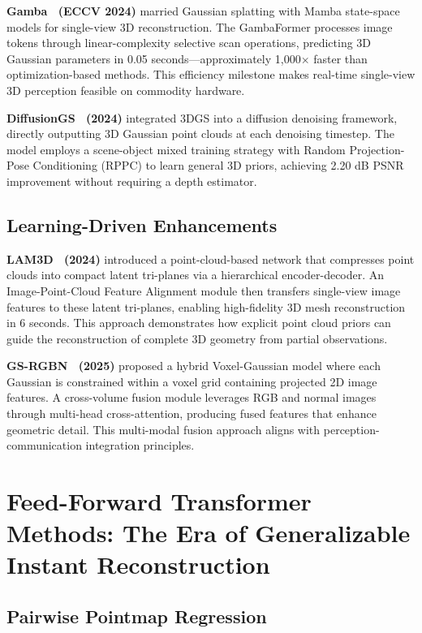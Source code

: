\documentclass[journal]{IEEEtran}
\begin{document}
\textbf{Gamba~\cite{gamba} (ECCV 2024)} married Gaussian splatting with Mamba state-space models for single-view 3D reconstruction. The GambaFormer processes image tokens through linear-complexity selective scan operations, predicting 3D Gaussian parameters in 0.05 seconds---approximately 1,000$\times$ faster than optimization-based methods. This efficiency milestone makes real-time single-view 3D perception feasible on commodity hardware.

\textbf{DiffusionGS~\cite{diffusiongs} (2024)} integrated 3DGS into a diffusion denoising framework, directly outputting 3D Gaussian point clouds at each denoising timestep. The model employs a scene-object mixed training strategy with Random Projection-Pose Conditioning (RPPC) to learn general 3D priors, achieving 2.20 dB PSNR improvement without requiring a depth estimator.

\subsection{Learning-Driven Enhancements}

\textbf{LAM3D~\cite{lam3d} (2024)} introduced a point-cloud-based network that compresses point clouds into compact latent tri-planes via a hierarchical encoder-decoder. An Image-Point-Cloud Feature Alignment module then transfers single-view image features to these latent tri-planes, enabling high-fidelity 3D mesh reconstruction in 6 seconds. This approach demonstrates how explicit point cloud priors can guide the reconstruction of complete 3D geometry from partial observations.

\textbf{GS-RGBN~\cite{gsrgbn} (2025)} proposed a hybrid Voxel-Gaussian model where each Gaussian is constrained within a voxel grid containing projected 2D image features. A cross-volume fusion module leverages RGB and normal images through multi-head cross-attention, producing fused features that enhance geometric detail. This multi-modal fusion approach aligns with perception-communication integration principles.

\section{Feed-Forward Transformer Methods: The Era of Generalizable Instant Reconstruction}
\label{sec:feedforward}

\subsection{Pairwise Pointmap Regression}
\end{document}
